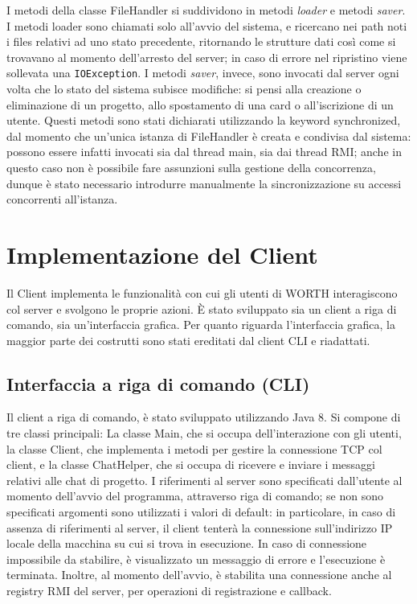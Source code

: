 \documentclass{article}
\begin{document}
I metodi della classe FileHandler si suddividono in metodi \emph{loader} e metodi \emph{saver}. I metodi loader sono chiamati solo all'avvio del sistema, e ricercano nei path noti i files relativi ad uno stato precedente, ritornando le strutture dati così come si trovavano al momento dell'arresto del server; in caso di errore nel ripristino viene sollevata una \texttt{IOException}. I metodi \emph{saver}, invece, sono invocati dal server ogni volta che lo stato del sistema subisce modifiche: si pensi alla creazione o eliminazione di un progetto, allo spostamento di una card o all'iscrizione di un utente. Questi metodi sono stati dichiarati utilizzando la keyword synchronized, dal momento che un'unica istanza di FileHandler è creata e condivisa dal sistema: possono essere infatti invocati sia dal thread main, sia dai thread RMI; anche in questo caso non è possibile fare assunzioni sulla gestione della concorrenza, dunque è stato necessario introdurre manualmente la sincronizzazione su accessi concorrenti all'istanza.




\newpage
\section{Implementazione del Client}
Il Client implementa le funzionalità con cui gli utenti di WORTH interagiscono col server e svolgono le proprie azioni. È stato sviluppato sia un client a riga di comando, sia un'interfaccia grafica. Per quanto riguarda l'interfaccia grafica, la maggior parte dei costrutti sono stati ereditati dal client CLI e riadattati. 

\subsection{Interfaccia a riga di comando (CLI)}
Il client a riga di comando, è stato sviluppato utilizzando Java 8. Si compone di tre classi principali: La classe Main, che si occupa dell'interazione con gli utenti, la classe Client, che implementa i metodi per gestire la connessione TCP col client, e la classe ChatHelper, che si occupa di ricevere e inviare i messaggi relativi alle chat di progetto. I riferimenti al server sono specificati dall'utente al momento dell'avvio del programma, attraverso riga di comando; se non sono specificati argomenti sono utilizzati i valori di default: in particolare, in caso di assenza di riferimenti al server, il client tenterà la connessione sull'indirizzo IP locale della macchina su cui si trova in esecuzione. In caso di connessione impossibile da stabilire, è visualizzato un messaggio di errore e l'esecuzione è terminata. Inoltre, al momento dell'avvio, è stabilita una connessione anche al registry RMI del server, per operazioni di registrazione e callback.
\end{document}

